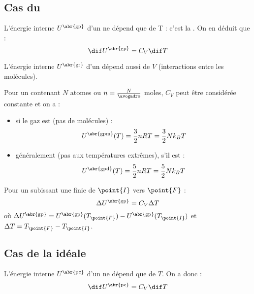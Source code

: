 \subsection{Cas du }

\begin{propriete}[admis]
L'énergie interne $U^{\text{\abr{gp}}}$ d'un  ne dépend que de T : c'est la . On en déduit que :
\[\dif U^{\text{\abr{gp}}} = C_V \dif T\]
\end{propriete}

\begin{remarque}
L'énergie interne $U^{\text{\abr{gr}}}$ d'un  dépend aussi de $V$ (interactions entre les molécules).
\end{remarque}

\begin{propriete}[admis]
Pour un  contenant $N$ atomes ou $n = \frac{N}{\avogadro}$ moles, $C_V$ peut être considérée constante et on a  :
\begin{itemize}
\item si le gaz est  (pas de molécules) :
\[U^{\text{\abr{gpm}}}(T) = \frac{3}{2} nRT = \frac{3}{2} N k_B T\]

\item généralement (pas aux températures extrêmes), s'il est  :
\[U^{\text{\abr{gpd}}}(T) = \frac{5}{2} nRT = \frac{5}{2} N k_B T\]
\end{itemize}
\end{propriete}

\begin{propriete}
Pour un  subissant une  finie de $\point{I}$ vers $\point{F}$ :
\[\Delta U^{\text{\abr{gp}}} = C_V \Delta T\]
où $\Delta U^{\text{\abr{gp}}} = U^{\text{\abr{gp}}}(T_{\point{F}}) - U^{\text{\abr{gp}}}(T_\point{I})$ et $\Delta T = T_{\point{F}} - T_{\point{I}}$.
\end{propriete}



\subsection{Cas de la  idéale}

\begin{propriete}[admis]
L'énergie interne $U^{\text{\abr{pc}}}$ d'un  ne dépend que de $T$. On a donc :
\[\dif U^{\text{\abr{pc}}} = C_V \dif T\]
\end{propriete}

